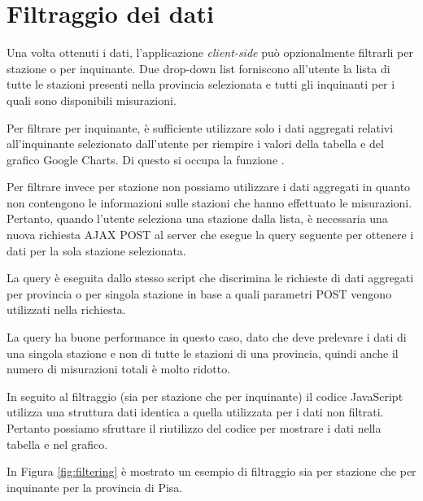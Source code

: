 \section{Filtraggio dei dati}

Una volta ottenuti i dati, l'applicazione \textit{client-side}  può opzionalmente filtrarli per stazione o
per inquinante. Due drop-down list forniscono all'utente la lista di tutte le
stazioni presenti nella provincia selezionata e tutti gli inquinanti per i quali
sono disponibili misurazioni.

Per filtrare per inquinante, è sufficiente utilizzare solo i dati aggregati
relativi all'inquinante selezionato dall'utente per riempire i valori della
tabella e del grafico Google Charts. Di questo si occupa la funzione
.

Per filtrare invece per stazione non possiamo utilizzare i dati aggregati in
quanto non contengono le informazioni sulle stazioni che hanno effettuato le
misurazioni. Pertanto, quando l'utente seleziona una stazione dalla lista, è
necessaria una nuova richiesta AJAX POST al server che esegue la query seguente
per ottenere i dati per la sola stazione selezionata.

La query è eseguita dallo stesso script  che
discrimina le richieste di dati aggregati per provincia o per singola stazione
in base a quali parametri POST vengono utilizzati nella richiesta.

La query ha buone performance in questo caso, dato che deve prelevare i dati di
una singola stazione e non di tutte le stazioni di una provincia, quindi anche
il numero di misurazioni totali è molto ridotto.

In seguito al filtraggio (sia per stazione che per inquinante) il codice
JavaScript utilizza una struttura dati identica a quella utilizzata per i dati
non filtrati. Pertanto possiamo sfruttare il riutilizzo del codice per mostrare
i dati nella tabella e nel grafico.

In Figura \vref{fig:filtering} è mostrato un esempio di filtraggio sia per
stazione che per inquinante per la provincia di Pisa.

